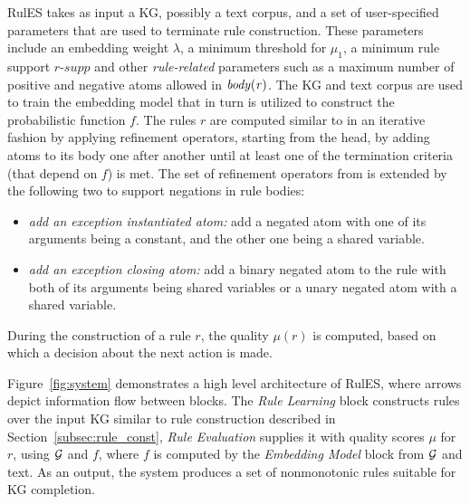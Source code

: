 RulES takes as input a KG, possibly a text corpus, and a set of user-specified parameters that are used to terminate rule construction.
These parameters include an embedding weight $\lambda$, 
a minimum threshold 
for $\mu_1$,  
a minimum rule support $\textit{r-supp}$ 
and other \emph{rule-related} parameters such as a maximum number of positive %
and negative 
atoms allowed in $\mathit{body(r)}$.
The KG and text corpus are used to train the embedding model that in turn is utilized to construct the probabilistic function $f$.
The rules $r$ are computed similar to \cite{amie} in an iterative fashion by applying refinement operators, starting from the head, by adding atoms to its body one after another until at least one of the termination criteria (that depend on $f$) is met. The set of refinement operators from \cite{amie} is extended by the following two to support negations in rule bodies:
\begin{itemize}
\item \emph{add an exception instantiated atom:} add a negated atom with one of its arguments
being a constant, and the other one being a shared variable.
\item \emph{add an exception closing atom:} add a binary negated atom to the rule with both of its
arguments being shared variables or a unary negated atom with a shared variable.
\end{itemize}
 During the construction of a rule $r$, the quality $\mu(r)$ is computed, based on which a decision about the next action is made.

Figure~\ref{fig:system} demonstrates a high level architecture of RulES, where arrows depict information flow between blocks.
The \emph{Rule Learning} block constructs rules over the input KG similar to rule construction described in Section~\ref{subsec:rule_const}, \emph{Rule Evaluation} supplies it with quality scores $\mu$ for $r$, using $\mathcal{G}$ and $f$, where $f$ is computed by the \emph{Embedding Model} block from $\mathcal{G}$ and text. As an output, the system produces a set of nonmonotonic rules suitable for KG completion.



 

